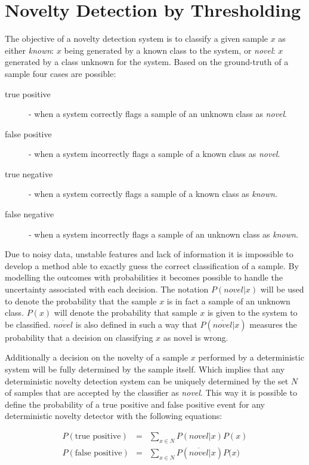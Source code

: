 \section{Novelty Detection by Thresholding}
\label{sec:threshold}
The objective of a novelty detection system is to classify a given sample $x$ as
either \emph{known}: $x$ being generated by a known class to the system, or \emph{novel}:
$x$ generated by a class unknown for the system.
Based on the ground\hyp{}truth of a sample four cases are possible:

\begin{description}
\item[true positive]  - when a system correctly   flags a sample of an unknown class as \emph{novel}.
\item[false positive] - when a system incorrectly flags a sample of a known class as \emph{novel}.
\item[true negative]  - when a system correctly   flags a sample of a known class as \emph{known}.
\item[false negative] - when a system incorrectly flags a sample of an unknown class as \emph{known}.
\end{description}

Due to noisy data, unstable features and lack of information it is impossible to develop
a method able to exactly guess the correct classification of a sample.
By modelling the outcomes with probabilities it becomes possible to handle the uncertainty
associated with each decision.
The notation $P(novel|x)$ will be used to denote the probability that the sample $x$ is in fact a
sample of an unknown class. $P(x)$ will denote the probability that sample $x$ is given to the
system to be classified. $\overline{novel}$ is also defined in such a way that
$P(\overline{novel}|x)$ measures the probability that a decision on classifying $x$ as novel is
wrong.

Additionally a decision on the novelty of a sample $x$ performed by a deterministic system
will be fully determined by the sample itself.
Which implies that any deterministic novelty detection system can be uniquely determined by the set $N$
of samples that are accepted by the classifier as \emph{novel}.
This way it is possible to define the probability of a true positive and false positive event for any
deterministic novelty detector with the following equations:

\begin{eqnarray}
P(\text{true positive})  &=& \sum_{x \in N}{P(novel|x)P(x)} \\
P(\text{false positive}) &=& \sum_{x \in N}{P(\overline{novel}|x)P(x})
\end{eqnarray}

